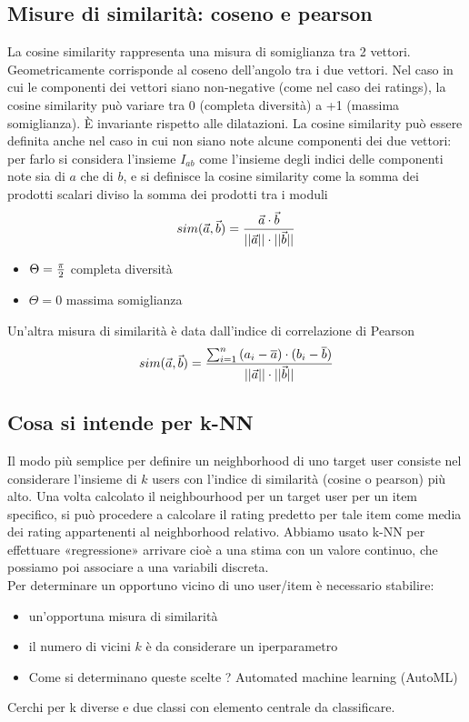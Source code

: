 \documentclass[12pt]{article}
\begin{document}
\subsection{Misure di similarità: coseno e pearson}
La cosine similarity rappresenta una misura di somiglianza tra 2 vettori.
Geometricamente corrisponde al coseno dell’angolo tra i due vettori. Nel caso in cui le componenti dei vettori siano non-negative (come nel caso
dei ratings), la cosine similarity può variare tra 0 (completa diversità) a +1 (massima somiglianza). È invariante rispetto alle dilatazioni. La cosine similarity può essere definita anche nel caso in cui non siano note alcune componenti dei due vettori: per farlo si considera l’insieme $I_{ab}$ come l’insieme degli indici delle componenti note sia di $a$ che di $b$, e si definisce la cosine similarity come la somma dei prodotti scalari diviso la somma dei prodotti tra i moduli
$$sim(\vec{a}, \vec{b}) = {{\vec{a} \cdot \vec{b}}\over{||\vec{a}|| \cdot ||\vec{b}||}}$$
\begin{itemize}
    \item $\Theta = {\pi \over 2}$ completa diversità
    \item $\Theta = 0$ massima somiglianza
\end{itemize}
Un'altra misura di similarità è data dall’indice di correlazione di Pearson
$$sim(\vec{a}, \vec{b}) = {{\sum_{i=1}^{n}{(a_i - \overline{a}) \cdot (b_i - \overline{b})}}\over{||\vec{a}|| \cdot ||\vec{b}||}}$$
\newpage
\subsection{Cosa si intende per k-NN}
Il modo più semplice per definire un neighborhood di uno target user consiste nel considerare l’insieme di $k$ users con l’indice di similarità (cosine o pearson) più alto. Una volta calcolato il neighbourhood per un target user per un item specifico, si può procedere a calcolare il rating predetto per tale item come media dei rating appartenenti al neighborhood relativo.
Abbiamo usato k-NN per effettuare «regressione» arrivare cioè a una stima con un valore continuo, che possiamo poi associare a una variabili discreta.
\\Per determinare un opportuno vicino di uno user/item è necessario stabilire:
\begin{itemize}
    \item un’opportuna misura di similarità
    \item il numero di vicini $k$ è da considerare un iperparametro
    \item Come si determinano queste scelte ? Automated machine learning (AutoML)
\end{itemize}
Cerchi per k diverse e due classi con elemento centrale da classificare.
\newpage
\end{document}
